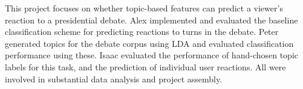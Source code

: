 
This project focuses on whether topic-based features can predict a viewer's reaction
to a presidential debate.
Alex implemented and evaluated the baseline classification scheme for predicting
reactions to turns in the debate.
Peter generated topics for the debate corpus using LDA and evaluated classification
performance using these.
Isaac evaluated the performance of hand-chosen topic labels for this task,
and the prediction of individual user reactions.
All were involved in substantial data analysis and project assembly.